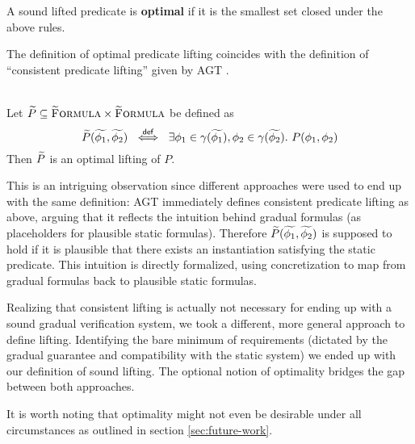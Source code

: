 \begin{definition}
    A sound lifted predicate is \textbf{optimal} if it is the smallest set closed under the above rules.
\end{definition}

The definition of optimal predicate lifting coincides with the definition of “consistent predicate lifting” given by AGT \cite{garcia2016abstracting}.
\begin{lemma}
    \label{lemma:consistent-pred-lifting-direct}~\\
    Let $\widetilde{P} \subseteq \textup{\textsc{\ensuremath{\widetilde{\text{F}}}ormula}} \times \textup{\textsc{\ensuremath{\widetilde{\text{F}}}ormula}}$ be defined as
    \begin{displaymath} 
    \widetilde{P}(\widetilde{\phi_1}, \widetilde{\phi_2}) ~\overset{\textup{\textmd{\textsf{def}}}}{\iff}~ \exists \phi_1 \in \gamma(\widetilde{\phi_1}), \phi_2 \in \gamma(\widetilde{\phi_2}).~ P(\phi_1, \phi_2)
    \end{displaymath}
    Then $\widetilde{P}$ is an optimal lifting of $P$.
\end{lemma} %
This is an intriguing observation since different approaches were used to end up with the same definition:
AGT immediately defines consistent predicate lifting as above, arguing that it reflects the intuition behind gradual formulas (as placeholders for plausible static formulas).
Therefore $\widetilde{P}(\widetilde{\phi_1}, \widetilde{\phi_2})$ is supposed to hold if it is plausible that there exists an instantiation satisfying the static predicate.
This intuition is directly formalized, using concretization to map from gradual formulas back to plausible static formulas.

\begin{comment}
We noticed early that this definition is too strong for gradual verification rules in general, due to the complexity of verification rules compared to typing rules:
A judgment $\thoare{}{\phi_1}{s}{\phi_2}$ (note that $s$ may be a sequence, contain method calls, etc.) 

In chapter \ref{sec:abstracting-static-semantics} we will see examples of gradual predicates which are not optimal and would thus not fit into AGT's model of consistent lifting.
\end{comment}

Realizing that consistent lifting is actually not necessary for ending up with a sound gradual verification system, we took a different, more general approach to define lifting.
Identifying the bare minimum of requirements (dictated by the gradual guarantee and compatibility with the static system) we ended up with our definition of sound lifting.
The optional notion of optimality bridges the gap between both approaches.

It is worth noting that optimality might not even be desirable under all circumstances as outlined in section \ref{sec:future-work}.


